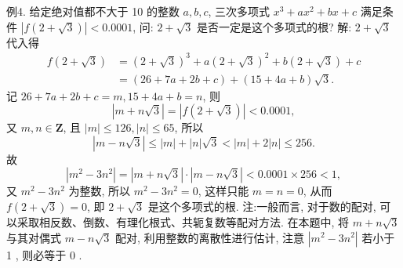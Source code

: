 例4. 给定绝对值都不大于 10 的整数 $a, b, c$, 三次多项式 $x^3+a x^2+ b x+c$ 满足条件 $|f(2+\sqrt{3})|<0.0001$, 问: $2+\sqrt{3}$ 是否一定是这个多项式的根?
解: $2+\sqrt{3}$ 代入得
$$
\begin{aligned}
f(2+\sqrt{3}) & =(2+\sqrt{3})^3+a(2+\sqrt{3})^2+b(2+\sqrt{3})+c \\
& =(26+7 a+2 b+c)+(15+4 a+b) \sqrt{3} .
\end{aligned}
$$
记 $26+7 a+2 b+c=m, 15+4 a+b=n$, 则
$$
|m+n \sqrt{3}|=|f(2+\sqrt{3})|<0.0001,
$$
又 $m, n \in \mathbf{Z}$, 且 $|m| \leqslant 126,|n| \leqslant 65$, 所以
$$
|m-n \sqrt{3}| \leqslant|m|+|n| \sqrt{3}<|m|+2|n| \leqslant 256 .
$$
故
$$
\left|m^2-3 n^2\right|=|m+n \sqrt{3}| \cdot|m-n \sqrt{3}|<0.0001 \times 256<1,
$$
又 $m^2-3 n^2$ 为整数, 所以 $m^2-3 n^2=0$, 这样只能 $m=n=0$, 从而 $f(2+ \sqrt{3})=0$, 即 $2+\sqrt{3}$ 是这个多项式的根.
注:一般而言, 对于数的配对, 可以采取相反数、倒数、有理化根式、共轭复数等配对方法.
在本题中, 将 $m+n \sqrt{3}$ 与其对偶式 $m-n \sqrt{3}$ 配对, 利用整数的离散性进行估计, 注意 $\left|m^2-3 n^2\right|$ 若小于 1 , 则必等于 0 .



